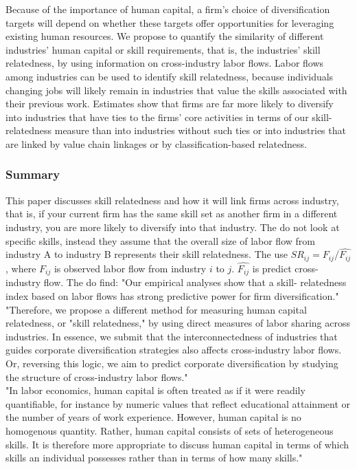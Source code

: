 \documentclass[12pt]{article}
\begin{document}
Because of the importance of human capital, a firm's choice of diversification targets will depend on whether these targets offer opportunities for leveraging existing human resources. We propose to quantify the similarity of different industries' human capital or skill requirements, that is, the industries' skill relatedness, by using information on cross-industry labor flows. Labor flows among industries can be used to identify skill relatedness, because individuals changing jobs will likely remain in industries that value the skills associated with their previous work. Estimates show that firms are far more likely to diversify into industries that have ties to the firms' core activities in terms of our skill-relatedness measure than into industries without such ties or into industries that are linked by value chain linkages or by classification-based relatedness.

\subsubsection*{Summary}

This paper discusses skill relatedness and how it will link firms across industry, that is, if your current firm has the same skill set as another firm in a different industry, you are more likely to diversify into that industry. The do not look at specific skills, instead they assume that the overall size of labor flow from industry A to industry B represents their skill relatedness. The use $SR_{ij}=F_{ij}/\hat{F_{ij}}$, where $F_{ij}$ is observed labor flow from industry $i$ to $j$. $\hat{F_{ij}}$ is predict cross-industry flow. The do find:  "Our empirical analyses show that a skill- relatedness index based on labor flows has strong predictive power for firm diversification."\\

"Therefore, we propose a different method for measuring human capital relatedness, or "skill relatedness," by using direct measures of labor sharing across industries. In essence, we submit that the interconnectedness of industries that guides corporate diversification strategies also affects cross-industry labor flows. Or, reversing this logic, we aim to predict corporate diversification by studying the structure of cross-industry labor flows." \\

"In labor economics, human capital is often treated as if it were readily quantifiable, for instance by numeric values that reflect educational attainment or the number of years of work experience. However, human capital is no homogenous quantity. Rather, human capital consists of sets of heterogeneous skills. It is therefore more appropriate to discuss human capital in terms of which skills an individual possesses rather than in terms of how many skills."
\end{document}
